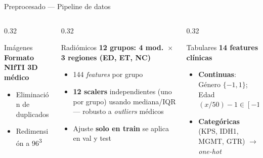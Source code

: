 \documentclass[aspectratio=169]{beamer}
\begin{document}
\begin{frame}{Preprocesado — Pipeline de datos}
  \begin{columns}[T]
    \begin{column}{0.32\textwidth}
      \begin{block}{Imágenes}
        \footnotesize
        \textbf{Formato NIfTI 3D médico}
        \begin{itemize}
          \item Eliminación de duplicados
          \item Redimensión a 96\textsuperscript{3}
        \end{itemize}
      \end{block}
    \end{column}
    \begin{column}{0.32\textwidth}
      \begin{block}{Radiómicos}
        \footnotesize
        \textbf{12 grupos: 4 mod.\ $\times$ 3 regiones (ED, ET, NC)}
        \begin{itemize}
          \item 144 \textit{features} por grupo
          \item \textbf{12 scalers} independientes (uno por grupo) usando mediana/IQR --- robusto a \textit{outliers} médicos
          \item Ajuste \textbf{solo en train} se aplica en val y test
        \end{itemize}
      \end{block}
    \end{column}
    \begin{column}{0.32\textwidth}
      \begin{block}{Tabulares}
        \footnotesize
        \textbf{14 features clínicas}
        \begin{itemize}
          \item \textbf{Continuas}: Género $\{-1,1\}$; Edad $(x/50)-1\in[-1,1]$
          \item \textbf{Categóricas} (KPS, IDH1, MGMT, GTR) $\to$ \textit{one-hot} 
        \end{itemize}
      \end{block}
    \end{column}
  \end{columns}

\end{frame}
\end{document}
